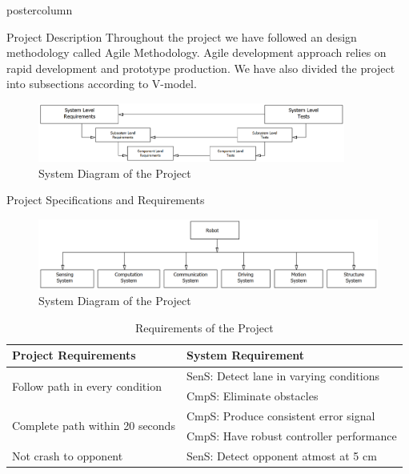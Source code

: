 \documentclass{beamer}
\begin{document}
\begin{frame}
\begin{columns}
\begin{column}{.5\textwidth}
\begin{beamercolorbox}[center]{postercolumn}
\begin{minipage}{.98\textwidth}
{\begin{myblock}{Project Description}
						Throughout the project we have followed an design methodology called Agile Methodology. Agile development approach relies on rapid development and prototype production. We have also divided the project into subsections according to V-model.
						
						\begin{figure}
							\centering
							\includegraphics[width=0.9\textwidth]{img/V-model}
							\caption{System Diagram of the Project}
							\label{fig:overall-system}
						\end{figure}
						\-\vspace{-2.5cm}
					\end{myblock} 	\vspace{-0.4em}
				\begin{myblock}{Project Specifications and Requirements}
					\begin{figure}
						\centering
						\includegraphics[width=\textwidth]{img/systems}
						\caption{System Diagram of the Project}
						\label{fig:overall-system}
					\end{figure}
				\vspace{-0.1cm}
				\begin{table}
					\caption{Requirements of the Project}
					\begin{tabular}{ll}
						Project Requirements   & System Requirement \\
						\hline 
						\multirow{2}{*}{Follow path in every condition }       &  SenS: Detect lane in varying conditions       \\
						&  CmpS: Eliminate obstacles \\
						\hline
						\multirow{2}{*}{Complete path within 20 seconds}    & CmpS: Produce consistent error signal  \\
						& CmpS: Have robust controller performance  \\
						\hline
						\multirow{2}{*}{Not crash to opponent}   & SenS: Detect opponent atmost at 5 cm        \\

\end{tabular}
\end{table}
\end{myblock}}
\end{minipage}
\end{beamercolorbox}
\end{column}
\end{columns}
\end{frame}
\end{document}
